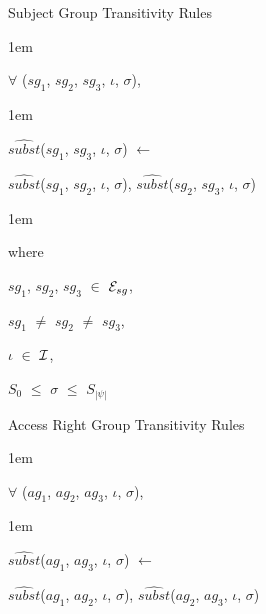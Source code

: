 \documentclass[11pt]{report}
\newenvironment{vquote}
{
  \begin{list}{}{\leftmargin 1em}\item[]
}
{
  \end{list}
}
\begin{document}
            \begin{enumerate}
              \item
                Subject Group Transitivity Rules

                \begin{vquote}
                  $\forall$ ($sg_{1}$, $sg_{2}$, $sg_{3}$, $\iota$, $\sigma$),
                \end{vquote}

                \begin{vquote}
                  $\hat{subst}$($sg_{1}$, $sg_{3}$, $\iota$, $\sigma$)
                  $\leftarrow$

                  \hspace{1em}
                  $\hat{subst}$($sg_{1}$, $sg_{2}$, $\iota$, $\sigma$),
                  $\hat{subst}$($sg_{2}$, $sg_{3}$, $\iota$, $\sigma$)
                \end{vquote}

                \begin{vquote}
                  where

                  \hspace{1em}
                  $sg_{1}$, $sg_{2}$, $sg_{3}$ $\in$ ${\cal E}_{sg}$,

                  \hspace{1em}
                  $sg_{1}$ $\neq$ $sg_{2}$ $\neq$ $sg_{3}$,

                  \hspace{1em}
                  $\iota$ $\in$ ${\cal I}$,

                  \hspace{1em}
                  $S_{0}$ $\leq$ $\sigma$ $\leq$ $S_{|\psi|}$
                \end{vquote}

              \item
                Access Right Group Transitivity Rules

                \begin{vquote}
                  $\forall$ ($ag_{1}$, $ag_{2}$, $ag_{3}$, $\iota$, $\sigma$),
                \end{vquote}

                \begin{vquote}
                  $\hat{subst}$($ag_{1}$, $ag_{3}$, $\iota$, $\sigma$)
                  $\leftarrow$

                  \hspace{1em}
                  $\hat{subst}$($ag_{1}$, $ag_{2}$, $\iota$, $\sigma$),
                  $\hat{subst}$($ag_{2}$, $ag_{3}$, $\iota$, $\sigma$)
                \end{vquote}


\end{enumerate}
\end{document}
